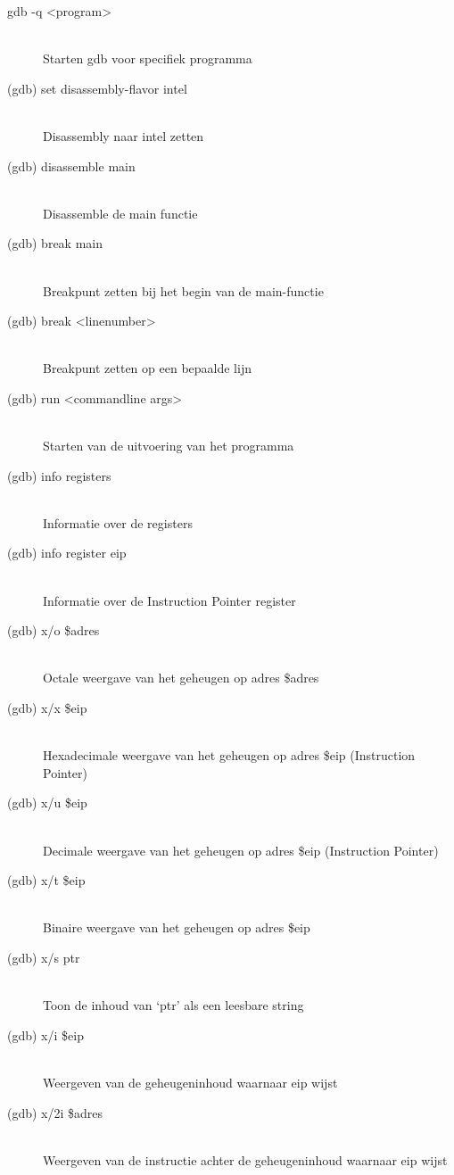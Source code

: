 \begin{description}
  \item[gdb -q \textless program\textgreater] \hfill \\
  Starten gdb voor specifiek programma
  \item[(gdb) set disassembly-flavor intel] \hfill \\
  Disassembly naar intel zetten
  \item[(gdb) disassemble main] \hfill \\
  Disassemble de main functie
  \item[(gdb) break main] \hfill \\
  Breakpunt zetten bij het begin van de main-functie
  \item[(gdb) break \textless linenumber\textgreater] \hfill \\
  Breakpunt zetten op een bepaalde lijn
  \item[(gdb) run \textless commandline args\textgreater] \hfill \\
  Starten van de uitvoering van het programma
  \item[(gdb) info registers] \hfill \\
  Informatie over de registers
  \item[(gdb) info register eip] \hfill \\
  Informatie over de Instruction Pointer register
  \item[(gdb) x/o \$adres] \hfill \\
  Octale weergave van het geheugen op adres \$adres
  \item[(gdb) x/x \$eip] \hfill \\
  Hexadecimale weergave van het geheugen op adres \$eip (Instruction Pointer)
  \item[(gdb) x/u \$eip] \hfill \\
  Decimale weergave van het geheugen op adres \$eip (Instruction Pointer)
  \item[(gdb) x/t \$eip] \hfill \\
  Binaire weergave van het geheugen op adres \$eip
  \item[(gdb) x/s ptr] \hfill \\
  Toon de inhoud van `ptr' als een leesbare string
  \item[(gdb) x/i \$eip] \hfill \\
  Weergeven van de geheugeninhoud waarnaar eip wijst
  \item[(gdb) x/2i \$adres] \hfill \\
  Weergeven van de instructie achter de geheugeninhoud waarnaar eip wijst

\end{description}
